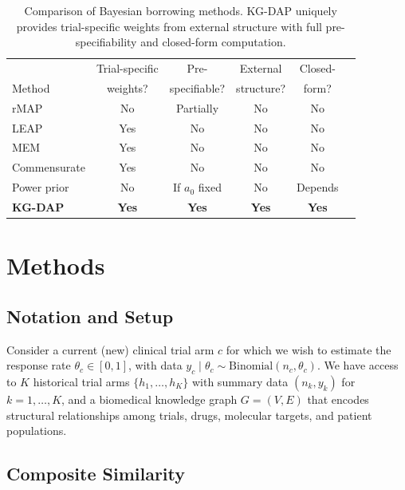 \documentclass[12pt]{article}
\newcommand{\thetac}{\theta_c}
\begin{document}
\begin{table}[t]
\centering
\caption{Comparison of Bayesian borrowing methods. KG-DAP uniquely provides trial-specific weights from external structure with full pre-specifiability and closed-form computation.}
\label{tab:method_comparison}
\begin{tabular}{lccccc}
\toprule
& Trial-specific & Pre- & External & Closed- \\
Method & weights? & specifiable? & structure? & form? \\
\midrule
rMAP \citep{schmidli2014robust} & No & Partially & No & No \\
LEAP \citep{alt2024leap} & Yes & No & No & No \\
MEM \citep{kaizer2018bayesian} & Yes & No & No & No \\
Commensurate \citep{hobbs2011hierarchical} & Yes & No & No & No \\
Power prior \citep{ibrahim2000power} & No & If $a_0$ fixed & No & Depends \\
\textbf{KG-DAP} & \textbf{Yes} & \textbf{Yes} & \textbf{Yes} & \textbf{Yes} \\
\bottomrule
\end{tabular}
\end{table}

\section{Methods}
\label{sec:methods}

\subsection{Notation and Setup}
\label{sec:notation}

Consider a current (new) clinical trial arm $c$ for which we wish to estimate the response rate $\thetac \in [0,1]$, with data $y_c \mid \thetac \sim \mathrm{Binomial}(n_c, \thetac)$. We have access to $K$ historical trial arms $\{h_1, \ldots, h_K\}$ with summary data $(n_k, y_k)$ for $k = 1, \ldots, K$, and a biomedical knowledge graph $G = (V, E)$ that encodes structural relationships among trials, drugs, molecular targets, and patient populations.

\subsection{Composite Similarity}
\label{sec:similarity}
\end{document}
